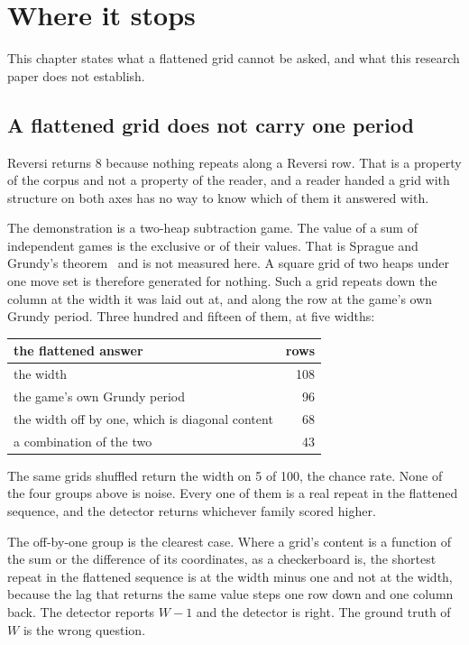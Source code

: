 \chapter{Where it stops}

This chapter states what a flattened grid cannot be asked, and what this research paper does not
establish.

\section{A flattened grid does not carry one period}

Reversi returns 8 because nothing repeats along a Reversi row. That is a property of the corpus and
not a property of the reader, and a reader handed a grid with structure on both axes has no way to
know which of them it answered with.

The demonstration is a two-heap subtraction game. The value of a sum of independent games is the
exclusive or of their values. That is Sprague and Grundy's theorem~\cite{src:Sprague-1935,src:Grundy-1939} and is not measured here. A square
grid of two heaps under one move set is therefore generated for nothing. Such a grid repeats down the column at the
width it was laid out at, and along the row at the game's own Grundy period. Three hundred and
fifteen of them, at five widths:

\begin{center}
\begin{tabular}{@{}lr@{}}
\toprule
the flattened answer & rows \\
\midrule
the width & 108 \\
the game's own Grundy period & 96 \\
the width off by one, which is diagonal content & 68 \\
a combination of the two & 43 \\
\bottomrule
\end{tabular}
\end{center}

The same grids shuffled return the width on 5 of 100, the chance rate. None of the four groups above
is noise. Every one of them is a real repeat in the flattened sequence, and the detector
returns whichever family scored higher.

The off-by-one group is the clearest case. Where a grid's content is a function of the sum or the
difference of its coordinates, as a checkerboard is, the shortest repeat in the flattened sequence is
at the width minus one and not at the width, because the lag that returns the same value steps one
row down and one column back. The detector reports \(W-1\) and the detector is right. The ground
truth of \(W\) is the wrong question.

